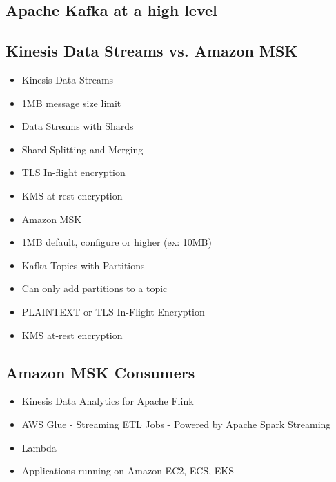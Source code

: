 \subsection{Apache Kafka at a high level}

\subsection{Kinesis Data Streams vs. Amazon MSK}
\begin{itemize}
    \item Kinesis Data Streams
    \item 1MB message size limit
    \item Data Streams with Shards
    \item Shard Splitting and Merging
    \item TLS In-flight encryption
    \item KMS at-rest encryption
    \item Amazon MSK
    \item 1MB default, configure or higher (ex: 10MB)
    \item Kafka Topics with Partitions
    \item Can only add partitions to a topic
    \item PLAINTEXT or TLS In-Flight Encryption
    \item KMS at-rest encryption
\end{itemize}

\subsection{Amazon MSK Consumers}
\begin{itemize}
    \item Kinesis Data Analytics for Apache Flink
    \item AWS Glue - Streaming ETL Jobs - Powered by Apache Spark Streaming
    \item Lambda
    \item Applications running on Amazon EC2, ECS, EKS
\end{itemize}


